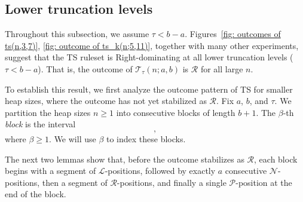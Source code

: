 \documentclass[oneside,reqno]{amsart}
\newcommand{\ts}{\mathcal{T}}
\newcommand{\lp}{\mathscr{L}}
\newcommand{\rp}{\mathscr{R}}
\newcommand{\np}{\mathscr{N}}
\newcommand{\pp}{\mathscr{P}}
\begin{document}






\subsection{Lower truncation levels}\label{subsec: lower truncation level}

Throughout this subsection, we assume $\tau<b-a$. Figures~\ref{fig: outcomes of ts(n,3,7)}, \ref{fig: outcome of ts_k(n;5,11)}, together with many other experiments, suggest that the {\sc TS} ruleset is Right-dominating at all lower truncation levels ($\tau<b-a$). That is, the outcome of $\ts_\tau(n;a,b)$ is $\rp$ for all large $n$.

To establish this result, we first analyze the outcome pattern of {\sc TS} for smaller heap sizes, where the outcome has not yet stabilized as $\rp$.
Fix $a$, $b$, and $\tau$. We partition the heap sizes $n\ge1$ into consecutive blocks of length $b+1$. The $\beta$-th {\em block} is the interval
\begin{equation}
[(\beta-1)(b+1)+1,\; \beta(b+1)],
\label{eq:beta}
\end{equation}
where $\beta\ge1$. We will use $\beta$ to index these blocks.

The next two lemmas show that, before the outcome stabilizes as $\rp$, each block begins with a segment of $\lp$-positions, followed by exactly $a$ consecutive $\np$-positions, then a segment of $\rp$-positions, and finally a single $\pp$-position at the end of the block.
\end{document}
